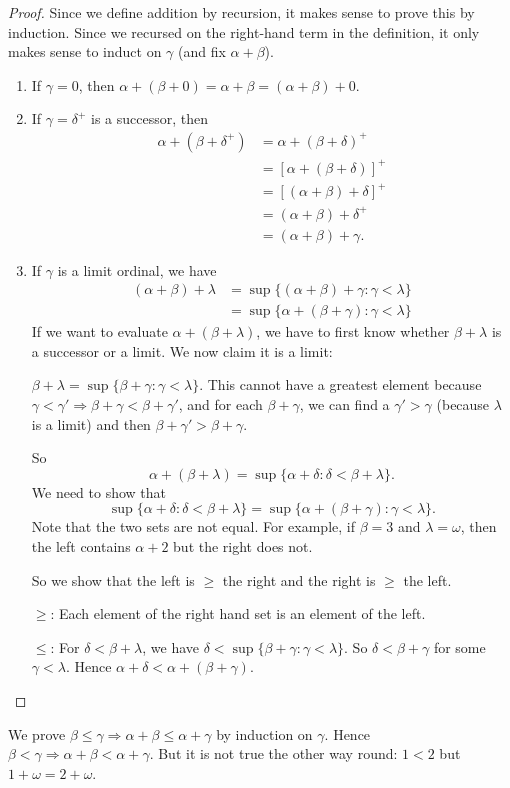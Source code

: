 \documentclass[a4paper]{article}
\begin{document}
\begin{proof}
  Since we define addition by recursion, it makes sense to prove this by induction. Since we recursed on the right-hand term in the definition, it only makes sense to induct on $\gamma$ (and fix $\alpha + \beta$).

\begin{enumerate}
  \item If $\gamma = 0$, then $\alpha + (\beta + 0) = \alpha + \beta = (\alpha + \beta) + 0$.
  \item If $\gamma = \delta^+$ is a successor, then 
    \begin{align*}
      \alpha + (\beta + \delta^+) &= \alpha + (\beta + \delta)^+\\
      &= [\alpha + (\beta + \delta)]^+\\
      &= [(\alpha + \beta) + \delta]^+\\
      &= (\alpha + \beta) + \delta^+\\
      &= (\alpha + \beta) + \gamma.
    \end{align*}
  \item If $\gamma$ is a limit ordinal, we have
    \begin{align*}
      (\alpha + \beta) + \lambda &= \sup\{(\alpha + \beta) + \gamma: \gamma < \lambda\}\\
      &= \sup\{\alpha + (\beta + \gamma): \gamma < \lambda\}
    \end{align*}
    If we want to evaluate $\alpha + (\beta + \lambda)$, we have to first know whether $\beta + \lambda$ is a successor or a limit. We now claim it is a limit:

    $\beta + \lambda = \sup\{\beta + \gamma: \gamma < \lambda\}$. This cannot have a greatest element because $\gamma < \gamma' \Rightarrow \beta + \gamma < \beta + \gamma'$, and for each $\beta + \gamma$, we can find a $\gamma' > \gamma$ (because $\lambda$ is a limit) and then $\beta + \gamma' > \beta + \gamma$.

    So
    \[
      \alpha + (\beta + \lambda) = \sup\{\alpha + \delta: \delta < \beta + \lambda\}.
    \]
    We need to show that
    \[
      \sup\{\alpha + \delta: \delta < \beta + \lambda\} = \sup\{\alpha + (\beta + \gamma): \gamma < \lambda\}.
    \]
    Note that the two sets are not equal. For example, if $\beta = 3$ and $\lambda = \omega$, then the left contains $\alpha + 2$ but the right does not.

    So we show that the left is $\geq$ the right and the right is $\geq$ the left.

    $\geq$: Each element of the right hand set is an element of the left.

    $\leq$: For $\delta < \beta + \lambda$, we have $\delta < \sup \{\beta + \gamma: \gamma < \lambda\}$. So $\delta < \beta + \gamma$ for some $\gamma < \lambda$. Hence $\alpha + \delta < \alpha + (\beta + \gamma)$.
\end{enumerate}
\end{proof}
\note  We prove $\beta \leq \gamma \Rightarrow  \alpha + \beta \leq \alpha + \gamma$ by induction on $\gamma$. Hence $\beta < \gamma \Rightarrow  \alpha + \beta < \alpha + \gamma$. But it is not true the other way round: $1 < 2$ but $1 + \omega = 2 + \omega$.
\end{document}
